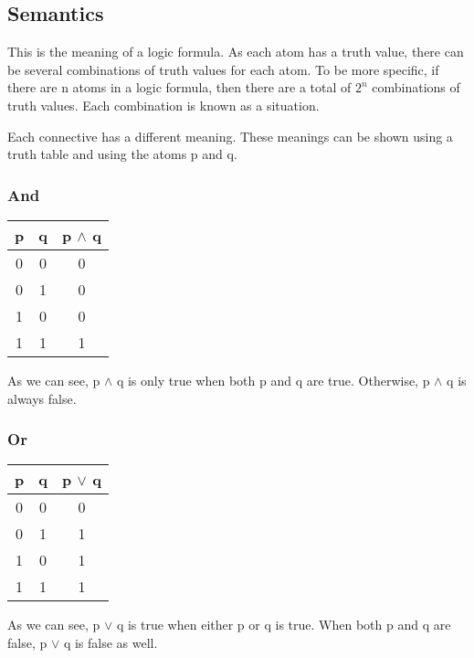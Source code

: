 \documentclass{report}
\begin{document}
\subsection{Semantics}
This is the meaning of a logic formula. As each atom has a truth value, there can
be several combinations of truth values for each atom. To be more specific, if there
are n atoms in a logic formula, then there are a total of $2 ^ n$ combinations of
truth values. Each combination is known as a situation.

Each connective has a different meaning. These meanings can be shown using a truth
table and using the atoms p and q. 

\subsubsection{And}

\begin{center}
  \begin{tabular}{| c | c | c |}
    \hline
    p & q & p $\land$ q \\ \hline
    0 & 0 & 0 \\
    0 & 1 & 0 \\
    1 & 0 & 0 \\
    1 & 1 & 1 \\ \hline
  \end{tabular}
\end{center}

As we can see, p $\land$ q is only true when both p and q are true. Otherwise,
p $\land$ q is always false.

\subsubsection{Or}

\begin{center}
  \begin{tabular}{| c | c | c |}
    \hline
    p & q & p $\lor$ q \\ \hline
    0 & 0 & 0 \\
    0 & 1 & 1 \\
    1 & 0 & 1 \\
    1 & 1 & 1 \\ \hline
  \end{tabular}
\end{center}

As we can see, p $\lor$ q is true when either p or q is true. When both p and q
are false, p $\lor$ q is false as well.
\end{document}
